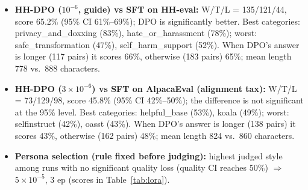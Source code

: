 \begin{itemize}
\item \textbf{HH-DPO ($10^{-6}$, guide) vs SFT on HH-eval:} W/T/L = 135/121/44, score 65.2\% (95\% CI 61\%--69\%); DPO is significantly better. Best categories: privacy\_and\_doxxing (83\%), hate\_or\_harassment (78\%); worst: safe\_transformation (47\%), self\_harm\_support (52\%). When DPO's answer is longer (117 pairs) it scores 66\%, otherwise (183 pairs) 65\%; mean length 778 vs.\ 888 characters.
\item \textbf{HH-DPO ($3\!\times\!10^{-6}$) vs SFT on AlpacaEval (alignment tax):} W/T/L = 73/129/98, score 45.8\% (95\% CI 42\%--50\%); the difference is not significant at the 95\% level. Best categories: helpful\_base (53\%), koala (49\%); worst: selfinstruct (42\%), oasst (43\%). When DPO's answer is longer (138 pairs) it scores 43\%, otherwise (162 pairs) 48\%; mean length 824 vs.\ 860 characters.
\item \textbf{Persona selection (rule fixed before judging):} highest judged style among runs with no significant quality loss (quality CI reaches 50\%) $\Rightarrow$ $5\!\times\!10^{-5}$, 3 ep (scores in Table~\ref{tab:lora}).
\end{itemize}
